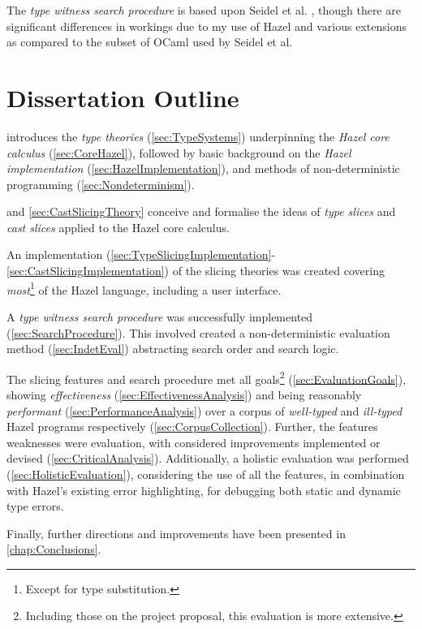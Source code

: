 The \textit{type witness search procedure} is	 based upon Seidel et al. \cite{SearchProc}, though there are significant differences in workings due to my use of Hazel and various extensions as compared to the subset of OCaml used by Seidel et al.

\section{Dissertation Outline}
\label{sec:Outline}
 introduces the \textit{type theories} (\cref{sec:TypeSystems}) underpinning the \textit{Hazel core calculus} (\cref{sec:CoreHazel}), followed by basic background on the \textit{Hazel implementation} (\cref{sec:HazelImplementation}), and methods of non-deterministic programming (\cref{sec:Nondeterminism}).

 and \cref{sec:CastSlicingTheory} conceive and formalise the ideas of \textit{type slices} and \textit{cast slices} applied to the Hazel core calculus. 
 
 An implementation (\cref{sec:TypeSlicingImplementation}-\ref{sec:CastSlicingImplementation}) of the slicing theories was created covering \textit{most}\footnote{Except for type substitution.} of the Hazel language, including a user interface. 
 
 A \textit{type witness search procedure} was successfully implemented (\cref{sec:SearchProcedure}). This involved created a non-deterministic evaluation method (\cref{sec:IndetEval}) abstracting search order and search logic.

The slicing features and search procedure met all goals\footnote{Including those on the project proposal, this evaluation is more extensive.} (\cref{sec:EvaluationGoals}), showing \textit{effectiveness} (\cref{sec:EffectivenessAnalysis}) and being reasonably \textit{performant} (\cref{sec:PerformanceAnalysis}) over a corpus of \textit{well-typed} and \textit{ill-typed} Hazel programs respectively (\cref{sec:CorpusCollection}). Further, the features weaknesses were evaluation, with considered improvements implemented or devised (\cref{sec:CriticalAnalysis}). Additionally, a holistic evaluation was performed (\cref{sec:HolisticEvaluation}), considering the use of all the features, in combination with Hazel's existing error highlighting, for debugging both static and dynamic type errors.

Finally, further directions and improvements have been presented in \cref{chap:Conclusions}.
